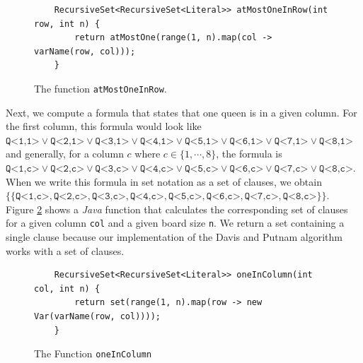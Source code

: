 \begin{figure}[!ht]
  \centering
\begin{verbatim}
    RecursiveSet<RecursiveSet<Literal>> atMostOneInRow(int row, int n) {
        return atMostOne(range(1, n).map(col -> varName(row, col)));
    }
\end{verbatim}
\vspace*{-0.3cm}
  \caption{The function \texttt{atMostOneInRow}.}
  \label{fig:atMostOneInRow}
\end{figure}
Next, we compute a formula that states that  one queen is in a given
column. For the first column, this formula would look like
\\[0.2cm]
\hspace*{1.3cm}
$\texttt{Q<1,1>} \vee \texttt{Q<2,1>} \vee \texttt{Q<3,1>} \vee \texttt{Q<4,1>} \vee \texttt{Q<5,1>} \vee
\texttt{Q<6,1>} \vee \texttt{Q<7,1>} \vee \texttt{Q<8,1>}$
\\[0.2cm]
and generally, for a column $c$ where $c \in \{1,\cdots,8\}$, the formula is
\\[0.2cm]
\hspace*{1.3cm}
$\texttt{Q<1,c>} \vee \texttt{Q<2,c>} \vee \texttt{Q<3,c>} \vee \texttt{Q<4,c>} \vee \texttt{Q<5,c>} \vee
\texttt{Q<6,c>} \vee \texttt{Q<7,c>} \vee \texttt{Q<8,c>}$.
\\[0.2cm]
When we write this formula in set notation as a set of clauses, we obtain
\\[0.2cm]
\hspace*{1.3cm}
$\bigl\{ \{\texttt{Q<1,c>} , \texttt{Q<2,c>} , \texttt{Q<3,c>} , \texttt{Q<4,c>} , \texttt{Q<5,c>} ,
\texttt{Q<6,c>} , \texttt{Q<7,c>} , \texttt{Q<8,c>} \}\bigr\}$.
\\[0.2cm]
Figure \ref{fig:oneInColumn} shows a \textsl{Java} function that calculates the corresponding set of clauses for a given column
\texttt{col} and a given board size \texttt{n}.
We return a set containing  a single clause because our implementation of the Davis and Putnam algorithm
works with a set of clauses.

\begin{figure}[!ht]
  \centering
\begin{verbatim}
    RecursiveSet<RecursiveSet<Literal>> oneInColumn(int col, int n) {
        return set(range(1, n).map(row -> new Var(varName(row, col))));
    }
\end{verbatim}
\vspace*{-0.3cm}
  \caption{The Function \texttt{oneInColumn}}
  \label{fig:oneInColumn}
\end{figure}

